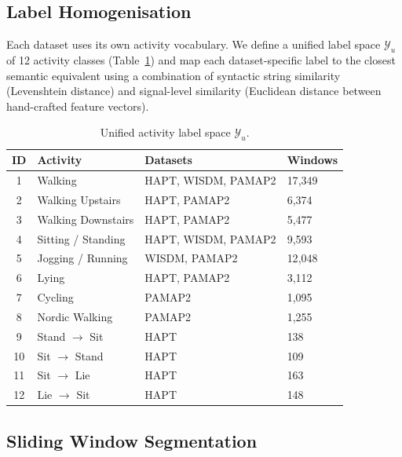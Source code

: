 \subsection{Label Homogenisation}

Each dataset uses its own activity vocabulary. We define a unified label
space $\mathcal{Y}_{u}$ of 12 activity classes (Table~\ref{tab:labels}) and
map each dataset-specific label to the closest semantic equivalent using a
combination of syntactic string similarity (Levenshtein distance) and
signal-level similarity (Euclidean distance between hand-crafted feature
vectors).

\begin{table}[h]
\centering
\caption{Unified activity label space $\mathcal{Y}_{u}$.}
\label{tab:labels}
\begin{tabular}{clll}
\toprule
\textbf{ID} & \textbf{Activity} & \textbf{Datasets} & \textbf{Windows} \\
\midrule
1  & Walking                     & HAPT, WISDM, PAMAP2 & 17{,}349 \\
2  & Walking Upstairs            & HAPT, PAMAP2        &  6{,}374 \\
3  & Walking Downstairs          & HAPT, PAMAP2        &  5{,}477 \\
4  & Sitting / Standing          & HAPT, WISDM, PAMAP2 &  9{,}593 \\
5  & Jogging / Running           & WISDM, PAMAP2       & 12{,}048 \\
6  & Lying                       & HAPT, PAMAP2        &  3{,}112 \\
7  & Cycling                     & PAMAP2              &  1{,}095 \\
8  & Nordic Walking              & PAMAP2              &  1{,}255 \\
9  & Stand $\rightarrow$ Sit     & HAPT                &    138   \\
10 & Sit $\rightarrow$ Stand     & HAPT                &    109   \\
11 & Sit $\rightarrow$ Lie       & HAPT                &    163   \\
12 & Lie $\rightarrow$ Sit       & HAPT                &    148   \\
\bottomrule
\end{tabular}
\end{table}

\subsection{Sliding Window Segmentation}

